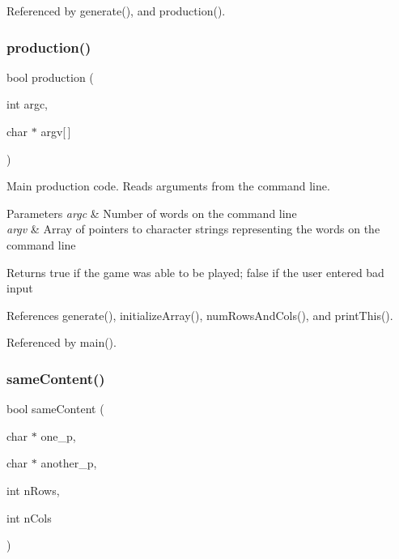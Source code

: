 Referenced by generate(), and production().

\mbox{\label{production_8c_a9f67b51c42a54745557e7a2c9c07c46f}} 
\subsubsection{production()}
{\footnotesize\ttfamily bool production (\begin{DoxyParamCaption}\item[{int}]{argc,  }\item[{char $\ast$}]{argv[$\,$] }\end{DoxyParamCaption})}

Main production code. Reads arguments from the command line. 
\begin{DoxyParams}{Parameters}
{\em argc} & Number of words on the command line \\
\hline
{\em argv} & Array of pointers to character strings representing the words on the command line \\
\hline
\end{DoxyParams}
\begin{DoxyReturn}{Returns}
true if the game was able to be played; false if the user entered bad input 
\end{DoxyReturn}


References generate(), initialize\+Array(), num\+Rows\+And\+Cols(), and print\+This().



Referenced by main().

\mbox{\label{production_8c_a6bc14537b7dc8361ace9f0ee6aa49440}} 
\subsubsection{same\+Content()}
{\footnotesize\ttfamily bool same\+Content (\begin{DoxyParamCaption}\item[{char $\ast$}]{one\+\_\+p,  }\item[{char $\ast$}]{another\+\_\+p,  }\item[{int}]{n\+Rows,  }\item[{int}]{n\+Cols }\end{DoxyParamCaption})}

